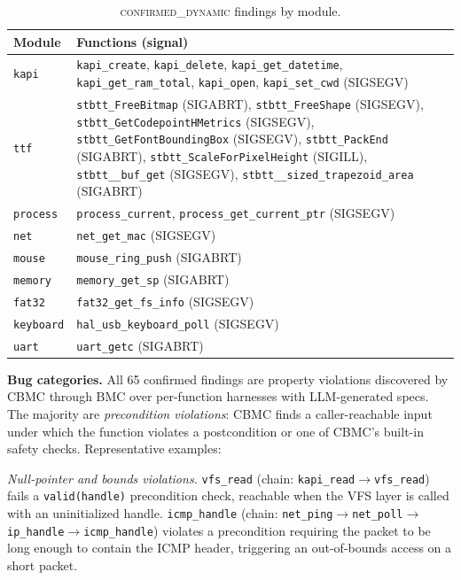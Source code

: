 \documentclass[11pt,a4paper]{article}
\newcommand{\dynconf}{\textsc{confirmed\_dynamic}\xspace}
\begin{document}
\begin{table}[t]
\caption{\dynconf findings by module.}
\label{tab:dynamic-findings}
\small
\begin{tabular}{lp{5.5cm}}
\toprule
\textbf{Module} & \textbf{Functions (signal)} \\
\midrule
\texttt{kapi}     & \texttt{kapi\_create}, \texttt{kapi\_delete},
                    \texttt{kapi\_get\_datetime}, \texttt{kapi\_get\_ram\_total},
                    \texttt{kapi\_open}, \texttt{kapi\_set\_cwd} (SIGSEGV) \\
\texttt{ttf}      & \texttt{stbtt\_FreeBitmap} (SIGABRT),
                    \texttt{stbtt\_FreeShape} (SIGSEGV),
                    \texttt{stbtt\_GetCodepointHMetrics} (SIGSEGV),
                    \texttt{stbtt\_GetFontBoundingBox} (SIGSEGV),
                    \texttt{stbtt\_PackEnd} (SIGABRT),
                    \texttt{stbtt\_ScaleForPixelHeight} (SIGILL),
                    \texttt{stbtt\_\_buf\_get} (SIGSEGV),
                    \texttt{stbtt\_\_sized\_trapezoid\_area} (SIGABRT) \\
\texttt{process}  & \texttt{process\_current}, \texttt{process\_get\_current\_ptr} (SIGSEGV) \\
\texttt{net}      & \texttt{net\_get\_mac} (SIGSEGV) \\
\texttt{mouse}    & \texttt{mouse\_ring\_push} (SIGABRT) \\
\texttt{memory}   & \texttt{memory\_get\_sp} (SIGABRT) \\
\texttt{fat32}    & \texttt{fat32\_get\_fs\_info} (SIGSEGV) \\
\texttt{keyboard} & \texttt{hal\_usb\_keyboard\_poll} (SIGSEGV) \\
\texttt{uart}     & \texttt{uart\_getc} (SIGABRT) \\
\bottomrule
\end{tabular}
\end{table}

\noindent\textbf{Bug categories.}
All 65 confirmed findings are property violations discovered by CBMC through
BMC over per-function harnesses with LLM-generated specs. The majority are
\emph{precondition violations}: CBMC finds a caller-reachable input under
which the function violates a postcondition or one of CBMC's built-in safety
checks. Representative examples:

\emph{Null-pointer and bounds violations.}
\texttt{vfs\_read} (chain: \texttt{kapi\_read}$\to$\texttt{vfs\_read}) fails
a \texttt{valid(handle)} precondition check, reachable when the VFS layer is
called with an uninitialized handle. \texttt{icmp\_handle} (chain:
\texttt{net\_ping}$\to$\texttt{net\_poll}$\to$\texttt{ip\_handle}$\to$\texttt{icmp\_handle})
violates a precondition requiring the packet to be long enough to contain the
ICMP header, triggering an out-of-bounds access on a short packet.
\end{document}
